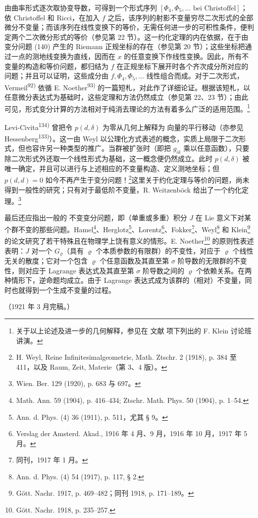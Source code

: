由曲率形式逐次取协变导数，可得到一个形式序列 $[\Phi_4,\Phi_5,\ldots\text{ bei Christoffel}]$；依 Christoffel 和 Ricci，在加入 $f$ 之后，该序列的射影不变量穷尽二次形式的全部微分不变量；而该序列在线性变换下的等价，无需任何进一步的可积性条件，便判定两个二次微分形式的等价（参见第 22 节）。这一约化定理的内在依据，在于由变分问题 (140) 产生的 Riemann 正规坐标的存在（参见第 20 节）；这些坐标把通过一点的测地线变换为直线，因而在 $x$ 的任意变换下作线性变换。因此，所有不变量的构造和等价问题，都归结为 $f$ 在正规坐标下展开时各个齐次成分所对应的问题；并且可以证明，这些成分由 $f,\Phi_4,\Phi_5,\ldots$ 线性组合而成。对于二次形式，Vermeil\textsuperscript{92)} 依循 E. Noether\textsuperscript{93)} 的一篇短札，对此作了详细论证。根据该短札，以任意微分表达式为基础时，这些定理和方法仍然成立（参见第 22、23 节）；由此可见，形式变分计算的方法相对于纯消去理论的方法有着多么广泛的适用范围。\footnote{关于以上论述及进一步的几何解释，参见在 \glqq{}文献\grqq{} 项下列出的 F. Klein 讨论班讲演。}

Levi-Civita\textsuperscript{134)} 曾把令 $p(d,\delta)$ 为零从几何上解释为 \glqq{}向量的平行移动\grqq{}（亦参见 Hessenberg\textsuperscript{133)}）。这一由 Weyl 以公理化方式表述的概念，实质上局限于二次形式，但也容许另一种类型的推广。当群被扩张时（即把 $g_{ik}$ 乘以任意函数），只要除二次形式外还取一个线性形式为基础，这一概念便仍然成立。此时 $p(d,\delta)$ 被唯一确定，并且可以进行与上述相应的不变量构造、定义测地坐标；但 $p(d,d)=0$ 如今不再产生于变分问题！\footnote{H. Weyl, Reine Infinitesimalgeometrie, Math. Ztschr. 2 (1918), p. 384 至 411，以及 Raum, Zeit, Materie（第 3、4 版）。}这里关于约化定理与等价的问题，尚未得到一般性的研究；只有对于最低阶不变量，R. Weitzenböck 给出了一个约化定理。\footnote{Wien. Ber. 129 (1920), p. 683 与 697。}

最后还应指出一般的 \glqq{}不变变分问题\grqq{}，即（单重或多重）积分 $J$ 在 Lie 意义下对某个群不变的那些问题。Hamel\footnote{Math. Ann. 59 (1904), p. 416--434; Ztschr. Math. Phys. 50 (1904), p. 1--54.}、Herglotz\footnote{Ann. d. Phys. (4) 36 (1911), p. 511，尤其 § 9。}、Lorentz\footnote{Verslag der Amsterd. Akad., 1916 年 4 月、9 月，1916 年 10 月，1917 年 5 月。}、Fokker\footnote{同刊，1917 年 1 月。}、Weyl\footnote{Ann. d. Phys. (4) 54 (1917), p. 117, § 2.} 和 Klein\footnote{Gött. Nachr. 1917, p. 469--482；同刊 1918, p. 171--189。} 的论文研究了若干特殊且在物理学上饶有意义的情形。E. Noether\footnote{Gött. Nachr. 1918, p. 235--257.} 的原则性表述表明：$J$ 对一个 $G_\varrho$（具有 $\varrho$ 个本质参数的有限群）的不变性，对应于 $\varrho$ 个线性无关的散度；它对一个包含 $\varrho$ 个任意函数及其直至第 $\sigma$ 阶导数的无限群的不变性，则对应于 Lagrange 表达式及其直至第 $\sigma$ 阶导数之间的 $\varrho$ 个依赖关系。在两种情形下，逆命题均成立。由于 Lagrange 表达式成为该群的（相对）不变量，同时也就得到一个生成不变量的过程。

\begin{center}
（1921 年 3 月完稿。）
\end{center}
\endgroup

\clearpage
\setcounter{footnote}{0}

